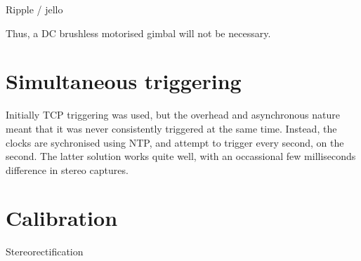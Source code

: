 Ripple / jello

Thus, a DC brushless motorised gimbal will not be necessary.

\section{Simultaneous triggering}

Initially TCP triggering was used, but the overhead and asynchronous nature meant that it was never consistently triggered at the same time. Instead, the clocks are sychronised using NTP, and attempt to trigger every second, on the second. The latter solution works quite well, with an occassional few milliseconds difference in stereo captures.

\section{Calibration}

Stereorectification